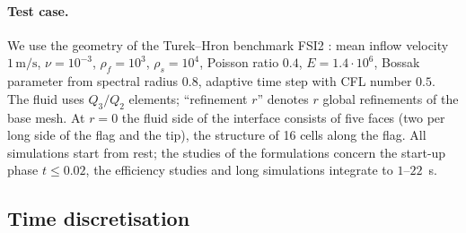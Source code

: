 \documentclass[11pt,a4paper]{article}
\theoremstyle{definition}
\theoremstyle{remark}
\begin{document}
\paragraph{Test case.} We use the geometry of the Turek--Hron benchmark FSI2 \cite{TurekHron2006}:
mean inflow velocity $1\,\mathrm{m/s}$, $\nu=10^{-3}$, $\rho_f=10^3$, $\rho_s=10^4$,
Poisson ratio $0.4$, $E=1.4\cdot10^6$, Bossak parameter from spectral radius $0.8$, adaptive time
step with CFL number $0.5$. The fluid uses $Q_3/Q_2$ elements; ``refinement $r$'' denotes $r$ global
refinements of the base mesh. At $r=0$ the fluid side of the interface consists of five faces (two
per long side of the flag and the tip), the structure of 16 cells along the flag. All simulations
start from rest; the studies of the formulations concern the start-up phase $t\le 0.02$, the
efficiency studies and long simulations integrate to $1$--$22$~s.

\subsection{Time discretisation}\label{sec:time}
\end{document}
